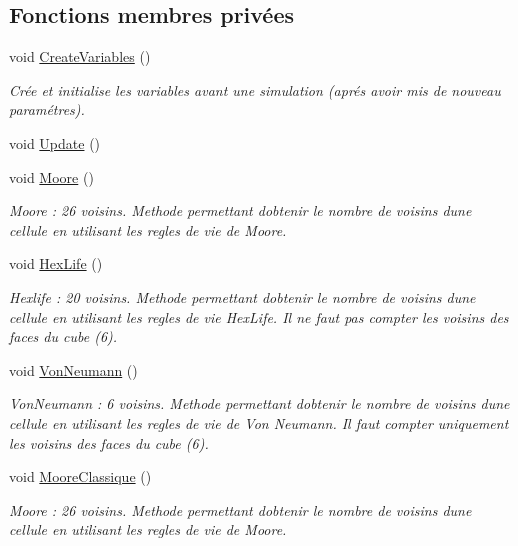 \subsection*{Fonctions membres privées}
\begin{DoxyCompactItemize}
\item 
void \mbox{\hyperlink{class_simulation_aeb4bcb9efba94261ae3225d7c77d4fe9}{Create\+Variables}} ()
\begin{DoxyCompactList}\small\item\em Crée et initialise les variables avant une simulation (aprés avoir mis de nouveau paramétres). \end{DoxyCompactList}\item 
void \mbox{\hyperlink{class_simulation_a8486cde41c003277c1ac75fffeda973b}{Update}} ()
\item 
void \mbox{\hyperlink{class_simulation_aad224ef6c13fac45281cf6c095c5c874}{Moore}} ()
\begin{DoxyCompactList}\small\item\em Moore \+: 26 voisins. Methode permettant d\textquotesingle{}obtenir le nombre de voisins d\textquotesingle{}une cellule en utilisant les regles de vie de Moore. \end{DoxyCompactList}\item 
void \mbox{\hyperlink{class_simulation_ade3470a637773f3e751ce4b0923c3909}{Hex\+Life}} ()
\begin{DoxyCompactList}\small\item\em Hexlife \+: 20 voisins. Methode permettant d\textquotesingle{}obtenir le nombre de voisins d\textquotesingle{}une cellule en utilisant les regles de vie Hex\+Life. Il ne faut pas compter les voisins des faces du cube (6). \end{DoxyCompactList}\item 
void \mbox{\hyperlink{class_simulation_af23614524fe3045d198d953f09264f79}{Von\+Neumann}} ()
\begin{DoxyCompactList}\small\item\em Von\+Neumann \+: 6 voisins. Methode permettant d\textquotesingle{}obtenir le nombre de voisins d\textquotesingle{}une cellule en utilisant les regles de vie de Von Neumann. Il faut compter uniquement les voisins des faces du cube (6). \end{DoxyCompactList}\item 
void \mbox{\hyperlink{class_simulation_a39f92768aa24cee944387315749314ad}{Moore\+Classique}} ()
\begin{DoxyCompactList}\small\item\em Moore \+: 26 voisins. Methode permettant d\textquotesingle{}obtenir le nombre de voisins d\textquotesingle{}une cellule en utilisant les regles de vie de Moore. \end{DoxyCompactList}\item 

\end{DoxyCompactItemize}
